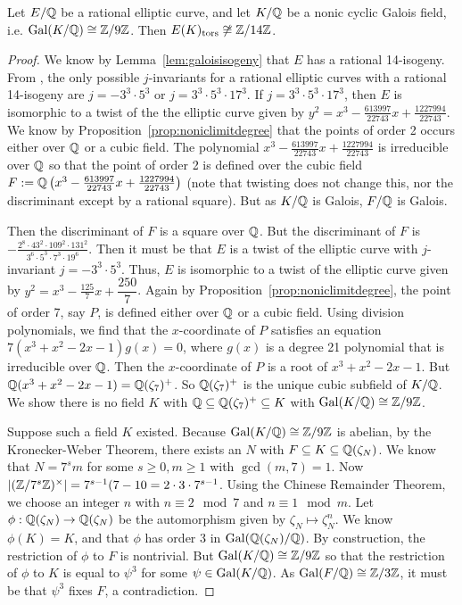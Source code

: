 \begin{lem} \label{lem:secondproof}
Let $E/\mathbb{Q}$ be a rational elliptic curve, and let $K/\mathbb{Q}$ be a nonic cyclic Galois field, i.e. $\operatorname{Gal}(K/\mathbb{Q}) \cong \mathbb{Z}/9\mathbb{Z}$. Then $E(K)_{\text{tors}} \not\cong \mathbb{Z}/14\mathbb{Z}$. 
\end{lem}

\begin{proof}
We know by Lemma~\ref{lem:galoisisogeny} that $E$ has a rational 14-isogeny. From \cite[Table~4]{lozanorobledo13}, the only possible $j$-invariants for a rational elliptic curves with a rational 14-isogeny are $j= -3^3 \cdot 5^3$ or $j= 3^3 \cdot 5^3 \cdot 17^3$. If $j= 3^3 \cdot 5^3 \cdot 17^3$, then $E$ is isomorphic to a twist of the the elliptic curve given by $y^2= x^3 - \frac{613997}{22743} x + \frac{1227994}{22743}$. We know by Proposition~\ref{prop:noniclimitdegree} that the points of order 2 occurs either over $\mathbb{Q}$ or a cubic field. The polynomial $x^3 - \frac{613997}{22743} x + \frac{1227994}{22743}$ is irreducible over $\mathbb{Q}$ so that the point of order 2 is defined over the cubic field $F:= \mathbb{Q}\left(x^3 - \frac{613997}{22743} x + \frac{1227994}{22743}\right)$ (note that twisting does not change this, nor the discriminant except by a rational square). But as $K/\mathbb{Q}$ is Galois, $F/\mathbb{Q}$ is Galois. 

Then the discriminant of $F$ is a square over $\mathbb{Q}$. But the discriminant of $F$ is $-\frac{2^8 \cdot 43^2 \cdot 109^2 \cdot 131^2}{3^6 \cdot 5^3 \cdot 7^3 \cdot 19^6}$. Then it must be that $E$ is a twist of the elliptic curve with $j$-invariant $j= -3^3 \cdot 5^3$. Thus, $E$ is isomorphic to a twist of the elliptic curve given by $y^2= x^3 - \frac{125}{7} x + \dfrac{250}{7}$. Again by Proposition~\ref{prop:noniclimitdegree}, the point of order 7, say $P$, is defined either over $\mathbb{Q}$ or a cubic field. Using division polynomials, we find that the $x$-coordinate of $P$ satisfies an equation $7(x^3 + x^2 - 2x - 1)g(x)= 0$, where $g(x)$ is a degree 21 polynomial that is irreducible over $\mathbb{Q}$. Then the $x$-coordinate of $P$ is a root of $x^3 + x^2 - 2x - 1$. But $\mathbb{Q}(x^3 + x^2 - 2x - 1)= \mathbb{Q}(\zeta_7)^+$. So $\mathbb{Q}(\zeta_7)^+$ is the unique cubic subfield of $K/\mathbb{Q}$. We show there is no field $K$ with $\mathbb{Q} \subseteq \mathbb{Q}(\zeta_7)^+ \subseteq K$ with $\operatorname{Gal}(K/\mathbb{Q}) \cong \mathbb{Z}/9\mathbb{Z}$. 

Suppose such a field $K$ existed. Because $\operatorname{Gal}(K/\mathbb{Q}) \cong \mathbb{Z}/9\mathbb{Z}$ is abelian, by the Kronecker-Weber Theorem, there exists an $N$ with $F \subseteq K \subseteq \mathbb{Q}(\zeta_N)$. We know that $N= 7^sm$ for some $s \geq 0, m \geq 1$ with $\gcd(m,7)=1$. Now $|(\mathbb{Z}/7^s\mathbb{Z})^\times|= 7^{s-1}(7-10= 2 \cdot 3 \cdot 7^{s-1}$. Using the Chinese Remainder Theorem, we choose an integer $n$ with $n \equiv 2 \mod 7$ and $n \equiv 1 \mod m$. Let $\phi: \mathbb{Q}(\zeta_N) \to \mathbb{Q}(\zeta_N)$ be the automorphism given by $\zeta_N \mapsto \zeta_N^n$. We know $\phi(K)=K$, and that $\phi$ has order 3 in $\operatorname{Gal}(\mathbb{Q}(\zeta_N)/\mathbb{Q})$. By construction, the restriction of $\phi$ to $F$ is nontrivial. But $\operatorname{Gal}(K/\mathbb{Q}) \cong \mathbb{Z}/9\mathbb{Z}$ so that the restriction of $\phi$ to $K$ is equal to $\psi^3$ for some $\psi \in \operatorname{Gal}(K/\mathbb{Q})$. As $\operatorname{Gal}(F/\mathbb{Q}) \cong \mathbb{Z}/3\mathbb{Z}$, it must be that $\psi^3$ fixes $F$, a contradiction. 
\end{proof}  


